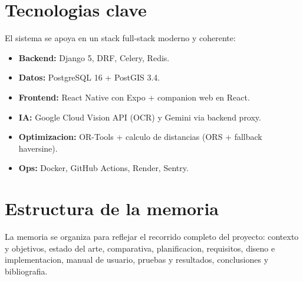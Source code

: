 \section{Tecnologias clave}

El sistema se apoya en un stack full-stack moderno y coherente:

\begin{itemize}
	\item \textbf{Backend:} Django 5, DRF, Celery, Redis.
	\item \textbf{Datos:} PostgreSQL 16 + PostGIS 3.4.
	\item \textbf{Frontend:} React Native con Expo + companion web en React.
	\item \textbf{IA:} Google Cloud Vision API (OCR) y Gemini via backend proxy.
	\item \textbf{Optimizacion:} OR-Tools + calculo de distancias (ORS + fallback haversine).
	\item \textbf{Ops:} Docker, GitHub Actions, Render, Sentry.
\end{itemize}

\section{Estructura de la memoria}

La memoria se organiza para reflejar el recorrido completo del proyecto: contexto y objetivos,
estado del arte, comparativa, planificacion, requisitos, diseno e implementacion,
manual de usuario, pruebas y resultados, conclusiones y bibliografia.
